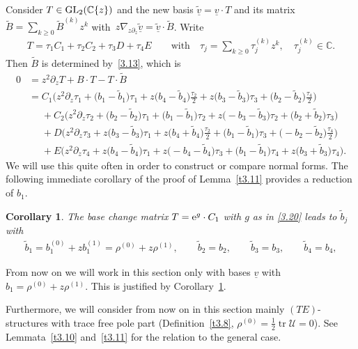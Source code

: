 \documentclass[10pt,a4paper]{amsart}
\numberwithin{equation}{section}
\numberwithin{figure}{section}
\newcommand{\C}{{\mathbb C}}
\newcommand{\UU}{{\mathcal U}}
\newcommand{\www}{\widetilde}
\newcommand{\uuuu}{\underline}
\newcommand{\paa}{\partial}
\newcommand{\nnn}{\nabla}
\DeclareMathOperator{\tr}{tr}
\newtheorem{Corollary}[Theorem]{Corollary}
\begin{document}
Consider $T\in {\rm GL}_2(\C\{z\})$ and the new basis
$\uuuu{\www v}=\uuuu{v}\cdot T$ and its matrix
$\www B =\sum_{k\geq 0}\www B^{(k)}z^k$ with~$z\nnn_{z\paa_z}\uuuu{\www v}=\uuuu{\www v}\cdot\www B$.
Write
\begin{gather*}%
T=\tau_1C_1+\tau_2C_2+\tau_3D+\tau_4E\qquad\text{with}\quad
\tau_j=\sum_{k\geq 0}\tau_j^{(k)}z^k,\quad
\tau_j^{(k)}\in\C.
\end{gather*}
Then $\www B$ is determined by~\eqref{3.13}, which is
\begin{align}
0&=z^2\paa_zT+B\cdot T-T\cdot\www B\nonumber
\\
&= C_1\bigg(z^2\paa_z\tau_1+\big(b_1-\www b_1\big)\tau_1
+z\big(b_4-\www b_4\big)\frac{\tau_2}{2}+z\big(b_3-\www b_3\big)\tau_3
+\big(b_2-\www b_2\big)\frac{\tau_4}{2}\bigg)\nonumber
\\
&\phantom{=}+ C_2\big(z^2\paa_z \tau_2+\big(b_2-\www b_2\big)\tau_1
+\big(b_1-\www b_1\big)\tau_2 + z\big({-}b_3-\www b_3\big)\tau_2
+ \big(b_2+\www b_2\big)\tau_3\big)\nonumber
\\
&\phantom{=}+ D\bigg(z^2\paa_z\tau_3+z\big(b_3-\www b_3\big)\tau_1
+z\big(b_4+\www b_4\big)\frac{\tau_2}{2}+\big(b_1-\www b_1\big)\tau_3
+ \big({-}b_2-\www b_2\big)\frac{\tau_4}{2}\bigg)\nonumber
\\
&\phantom{=}+ E\big(z^2\paa_z\tau_4 +z\big(b_4-\www b_4\big)\tau_1
+z\big({-}b_4-\www b_4\big)\tau_3+\big(b_1-\www b_1\big)\tau_4
+z\big(b_3+\www b_3\big)\tau_4\big).\label{4.19}
\end{align}
We will use this quite often in order to construct
or compare normal forms. The following immediate corollary
of the proof of
Lemma~\ref{t3.11} provides a reduction of $b_1$.

\begin{Corollary}\label{t4.8}
The base change matrix $T={\rm e}^g\cdot C_1$ with $g$ as in
\eqref{3.20} leads to $\www b_j$ with
\begin{gather*}%
\www b_1=b_1^{(0)}+zb_1^{(1)}=\rho^{(0)}+z \rho^{(1)},\qquad
\www b_2=b_2,\qquad \www b_3=b_3,\qquad \www b_4=b_4,
\end{gather*}
\end{Corollary}

From now on we will work in this section only with bases
$\uuuu{v}$ with $b_1=\rho^{(0)}+z \rho^{(1)}$. This is justified
by Corollary~\ref{t4.8}.

Furthermore, we will consider from now on in this section
mainly $(TE)$-structures with trace free pole part
\big(Definition~\ref{t3.8}, $\rho^{(0)}=\frac{1}{2}\tr\UU=0$\big).
See Lemmata~\ref{t3.10} and~\ref{t3.11} for the
relation to the general case.
\end{document}
